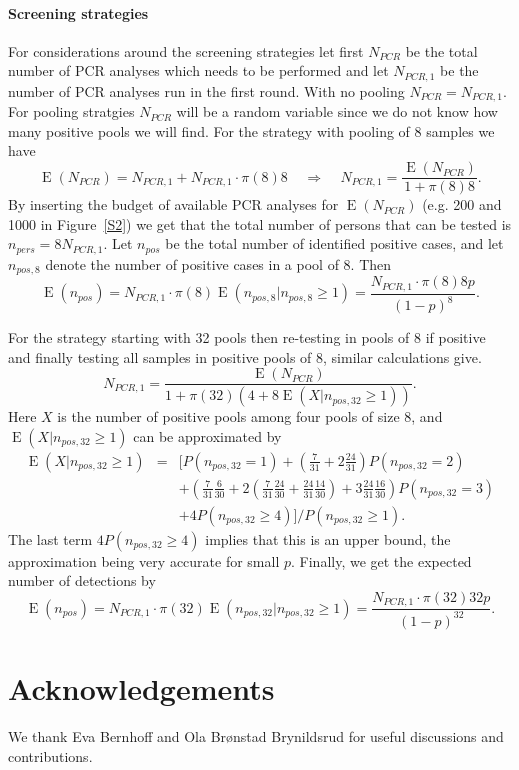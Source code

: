 \documentclass[10pt]{article}
\DeclareMathOperator{\E}{E}
\begin{document}
\paragraph*{Screening strategies}
For considerations around the screening strategies let first $N_{PCR}$ be the total number of PCR analyses which needs to be performed and let $N_{PCR,1}$ be the number of PCR analyses run in the first round. With no pooling $N_{PCR}=N_{PCR,1}$. For pooling stratgies $N_{PCR}$ will be a random variable since we do not know how many positive pools we will find. For the strategy with pooling of 8 samples we have
$$
\E(N_{PCR})=N_{PCR,1}+N_{PCR,1}\cdot\pi(8) 8 
\;\;\;\;  \Rightarrow  \;\;\;\;
N_{PCR,1}=\frac{\E(N_{PCR})}{1+\pi(8) 8}. 
$$
By inserting the budget of available PCR analyses for $\E(N_{PCR})$ (e.g. 200 and 1000 in Figure~\ref{S2}) we get that the total number of persons that can be tested is $n_{pers}=8N_{PCR,1}$. Let $n_{pos}$ be the total number of identified positive cases, and let $n_{pos,8}$ denote the number of positive cases in a pool of 8. Then
$$
\E(n_{pos})=N_{PCR,1}\cdot\pi(8)\E(n_{pos,8}|n_{pos,8}\geq 1)=\frac{N_{PCR,1}\cdot \pi(8) 8 p}{(1-p)^8}.
$$  

For the strategy starting with 32 pools then re-testing in pools of 8 if positive and finally testing all samples in positive pools of 8, similar calculations give. 
$$
N_{PCR,1}=\frac{\E(N_{PCR})}{1+\pi(32) (4+8 \E(X|n_{pos,32}\geq 1))}.  
$$
Here $X$ is the number of positive pools among four pools of size 8, and $\E(X|n_{pos,32}\geq 1)$ can be approximated by
\begin{eqnarray*}
\E(X|n_{pos,32}\geq 1) &=& [P(n_{pos,32}=1)+(\frac{7}{31}+2\frac{24}{31})P(n_{pos,32}=2)  \\
&& +(\frac{7}{31}\frac{6}{30}+2(\frac{7}{31}\frac{24}{30}+\frac{24}{31}\frac{14}{30})+3\frac{24}{31}\frac{16}{30})P(n_{pos,32}=3)\\
&& +4P(n_{pos,32}\geq 4) ]/P(n_{pos,32}\geq 1).
\end{eqnarray*}
The last term $4P(n_{pos,32}\geq 4)$ implies that this is an upper bound, the approximation being very accurate for small $p$. Finally, we get the expected number of detections by
$$
\E(n_{pos})=N_{PCR,1}\cdot\pi(32)\E(n_{pos,32}|n_{pos,32}\geq 1)=\frac{N_{PCR,1}\cdot \pi(32) 32 p}{(1-p)^{32}}.
$$  
\section*{Acknowledgements}
We thank Eva Bernhoff and Ola Brønstad Brynildsrud for useful discussions and contributions.
{}
\end{document}
